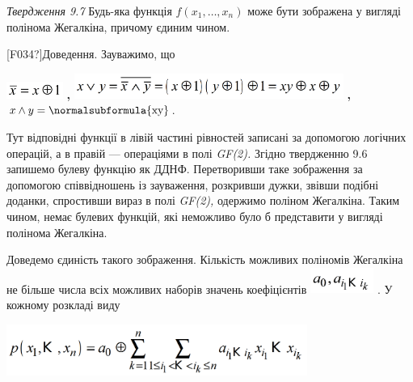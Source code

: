 \textit{Твердження 9.7}  Будь-яка функція 
${f(x_{{1}},\dots,x_{{n}})}$ може бути зображена у вигляді
полінома Жегалкіна, причому єдиним чином.

\textlatin{[F034?]}Доведення. Зауважимо, що 

{\centering
 \includegraphics[width=0.728in,height=0.2161in]{crypt-img/crypt-img119.png}
\textbf{, }
\includegraphics[width=3.4709in,height=0.3228in]{crypt-img/crypt-img120.png}
\textbf{,  } ${x\wedge y=\normalsubformula{\text{xy}}}$.
\par}

Тут відповідні функції в лівій частині рівностей записані за допомогою логічних
операцій, а в правій --- операціями в полі  \textit{GF(2).} Згідно твердженню
9.6\textit{ }запишемо\textit{ }булеву функцію як ДДНФ. Перетворивши таке
зображення за допомогою співвідношень із зауваження, розкривши дужки, звівши
подібні доданки, спростивши вираз  в полі \textit{GF(2)}\textit{, }одержимо
поліном Жегалкіна. Таким чином, немає булевих функцій, які неможливо було б
представити у вигляді полінома Жегалкіна.

Доведемо єдиність такого зображення. Кількість можливих поліномів Жегалкіна не
більше числа всіх можливих наборів значень коефіцієнтів 
\includegraphics[width=0.8154in,height=0.3307in]{crypt-img/crypt-img121.png} .
У кожному розкладі виду

{\centering 
\includegraphics[width=3.8752in,height=0.6661in]{crypt-img/crypt-img122.png}
\par}

